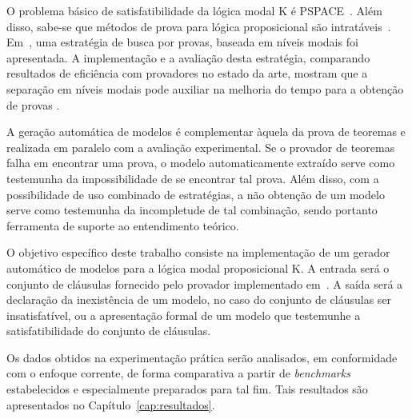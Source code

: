 O problema básico de satisfatibilidade da lógica modal K é
PSPACE~\cite{complex_modal}. 
Além disso, sabe-se que métodos de prova para lógica proposicional são
intratáveis~\cite{complex_thproving}. Em~\cite{DBLP:conf/tableaux/NalonHD15},
uma estratégia de busca por provas, baseada em níveis modais foi apresentada. A
implementação e a avaliação desta estratégia, comparando resultados de
eficiência com provadores no estado da arte, mostram que a separação em níveis
modais pode auxiliar na melhoria do tempo para a obtenção de provas
\cite{Nalon2016}.

A geração automática de modelos é complementar àquela da prova de teoremas e
realizada em paralelo com a avaliação experimental. Se o provador de teoremas
falha em encontrar uma prova, o modelo automaticamente extraído serve como
testemunha da impossibilidade de se encontrar tal prova. Além disso, com a
possibilidade de uso combinado de estratégias, a não obtenção de um modelo serve
como testemunha da incompletude de tal combinação, sendo portanto ferramenta de
suporte ao entendimento teórico.

O objetivo específico deste trabalho consiste na implementação de um gerador
automático de modelos para a lógica modal proposicional K. A entrada será o
conjunto de cláusulas fornecido pelo provador implementado
em~\cite{Nalon2016}. 
A saída será a declaração da inexistência de um modelo, no caso do conjunto de
cláusulas ser insatisfatível, ou a apresentação formal de um modelo que
testemunhe a satisfatibilidade do conjunto de cláusulas.

Os dados obtidos na experimentação prática serão analisados, em conformidade com
o enfoque corrente, de forma comparativa a partir de \textit{benchmarks}
estabelecidos e especialmente preparados para tal fim. Tais resultados são
apresentados no Capítulo~\ref{cap:resultados}.

